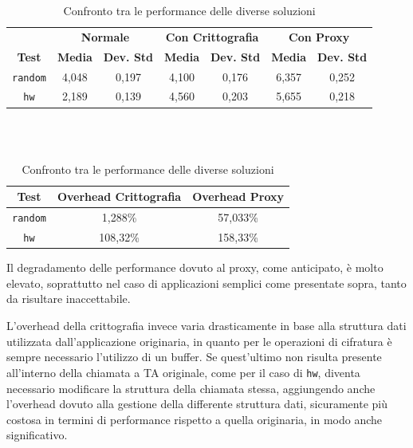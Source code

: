 \documentclass[12pt,italian]{report}
\begin{document}
	\begin{table}[h]
		\centering
		\begin{tabular}{ccccccc}
			\multicolumn{1}{c|}{}                 & 
			\multicolumn{2}{c|}{\textbf{Normale}} & 
			\multicolumn{2}{c|}{\textbf{Con Crittografia}} & 
			\multicolumn{2}{c}{\textbf{Con Proxy}} \\
			
			\multicolumn{1}{c|}{\multirow{-2}{*}{\textbf{Test}}} &
			\multicolumn{1}{c|}{\textbf{Media}}     &
			\multicolumn{1}{c|}{\textbf{Dev. Std}}  &
			\multicolumn{1}{c|}{\textbf{Media}}     &
			\multicolumn{1}{c|}{\textbf{Dev. Std}}  &
			\multicolumn{1}{c|}{\textbf{Media}}     &  
			\multicolumn{1}{c}{\textbf{Dev. Std}}  \\ \hline
			\texttt{random}          & 4,048     & 0,197     & 4,100     & 0,176     & 6,357     & 0,252     \\
			\texttt{hw}    & 2,189     & 0,139     & 4,560     & 0,203     & 5,655     & 0,218     \\
		\end{tabular}
		
		\hfill \\
		\hfill \\
		
		\begin{tabular}{ccc}
			\multicolumn{1}{c|}{\textbf{Test}} & \multicolumn{1}{c|}{\textbf{Overhead Crittografia}} & \multicolumn{1}{c}{\textbf{Overhead Proxy}} \\
			\hline
			\texttt{random}        & 1,288\%   & 57,033\%  \\
			\texttt{hw}  & 108,32\%  & 158,33\%  \\
		\end{tabular}
		
		\caption{ Confronto tra le performance delle diverse soluzioni }
		\label{tab:performance}
	\end{table}
	
	Il degradamento delle performance dovuto al proxy, come anticipato, è molto elevato, soprattutto nel caso di applicazioni semplici come presentate sopra, tanto da risultare inaccettabile.
	
	L'overhead della crittografia invece varia drasticamente in base alla struttura dati utilizzata dall'applicazione originaria, in quanto per le operazioni di cifratura è sempre necessario l'utilizzo di un buffer. Se quest'ultimo non risulta presente all'interno della chiamata a TA originale, come per il caso di \texttt{hw}, diventa necessario modificare la struttura della chiamata stessa, aggiungendo anche l'overhead dovuto alla gestione della differente struttura dati, sicuramente più costosa in termini di performance rispetto a quella originaria, in modo anche significativo.
	
\end{document}
